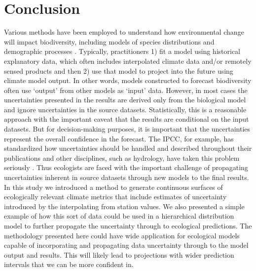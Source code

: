 \documentclass[12pt]{article}
\begin{document}
\section{Conclusion}
Various methods have been employed to understand how environmental
change will impact biodiversity, including models of species
distributions \citep[e.g.][]{franklin_modeling_2012} and demographic processes
\citep[e.g.][]{jenouvrier_effects_2012}.  Typically, practitioners 1) fit a
model using historical explanatory data, which often includes
interpolated climate data and/or remotely sensed products and then 2)
use that model to project into the future using climate model
output. In other words, models constructed to forecast biodiversity
often use `output' from other models as `input' data.  However, in
most cases the uncertainties presented in the results are derived only
from the biological model and ignore uncertainties in the source
datasets.  Statistically, this is a reasonable approach with the
important caveat that the results are conditional on the input
datasets.  But for decision-making purposes, it is important that the
uncertainties represent the overall confidence in the forecast.  The
IPCC, for example, has standardized how uncertainties should be
handled and described throughout their publications
\citep{mastrandrea_guidance_2010} and other disciplines, such as
hydrology, have taken this problem seriously \citep[e.g.][]{Liu_uncertainty_2007}.   Thus ecologists are
faced with the important challenge of propagating uncertainties
inherent in source datasets through new models to the final results.
In this study we introduced a method to generate continuous surfaces of
ecologically relevant climate metrics that include estimates of
uncertainty introduced by the interpolating from station values.  We
also presented  a simple example of how this sort of data could be
used in a hierarchical distribution model to further propagate the
uncertainty through to ecological predictions.  
The methodology presented here could have wide application for
ecological models capable of incorporating and propagating data
uncertainty through to the model output and results.  This will likely lead to projections with
wider prediction intervals that we can be more confident in.  

\singlespacing


\doublespacing
\end{document}
